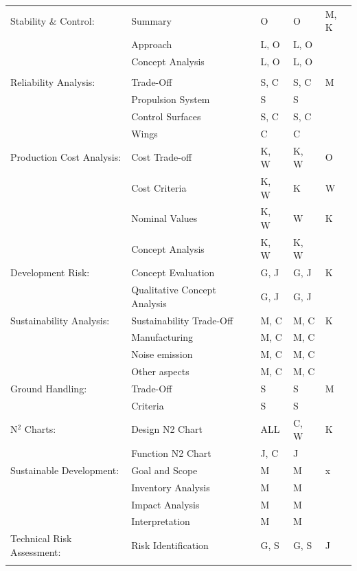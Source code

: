 \begin{longtable}[htb]{llp{1.5cm}p{1.5cm}p{1cm}}
    Stability \& Control: & Summary & O & O & M, K \\ \hdashline
        & Approach & L, O & L, O & \\ \hdashline
        & Concept Analysis & L, O & L, O & \\ \hdashline
        &  & & & \\ \hdashline
    Reliability Analysis: & Trade-Off & S, C  & S, C & M \\ \hdashline
        & Propulsion System & S & S & \\ \hdashline
        & Control Surfaces & S, C & S, C & \\ \hdashline
        & Wings & C & C & \\ \hdashline
    Production Cost Analysis: & Cost Trade-off & K, W & K, W & O \\ \hdashline
        & Cost Criteria & K, W & K & W \\ \hdashline
        & Nominal Values & K, W & W & K \\ \hdashline
        & Concept Analysis & K, W & K, W & \\ \hdashline
    Development Risk: & Concept Evaluation & G, J & G, J & K \\ \hdashline
        & Qualitative Concept Analysis & G, J & G, J & \\ \hdashline
    Sustainability Analysis: & Sustainability Trade-Off & M, C  & M, C & K\\ \hdashline
        & Manufacturing & M, C & M, C & \\ \hdashline
        & Noise emission & M, C & M, C & \\ \hdashline
        & Other aspects & M, C & M, C & \\ \hdashline
    Ground Handling: & Trade-Off & S & S & M \\ \hdashline
        & Criteria & S & S & \\ \hdashline
    N$^2$ Charts: & Design N2 Chart & ALL & C, W & K \\ \hdashline
        & Function N2 Chart & J, C & J & \\ \hdashline
    Sustainable Development: & Goal and Scope & M & M & x \\ \hdashline
        & Inventory Analysis & M & M & \\ \hdashline
        & Impact Analysis & M & M & \\ \hdashline
        & Interpretation & M & M & \\ \hdashline
    Technical Risk Assessment: & Risk Identification & G, S & G, S & J \\ \hdashline

\end{longtable}
